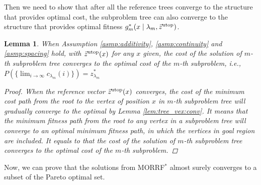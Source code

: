 \documentclass{article}
\newtheorem{lem}{Lemma}
\begin{document}
Then we need to show that after all the reference trees converge to the structure that provides optimal cost, 
the subproblem tree can also converge to the structure that provides optimal fitness $ g^{*}_{m} ( x \mid \lambda_{m} , \vec{z}^{\rm utop} ) $.
\begin{lem}
\label{lem:sub_tree:conv}
When Assumption \ref{asmp:additivity}, \ref{asmp:continuity} and \ref{asmp:spacing} hold,
with $ \vec{z}^{\rm utop} (x) $ for any $ x $ given,
the cost of the solution of $ m $-th subproblem tree converges to the optimal cost of the $ m $-th subproblem, i.e.,
$
P( \{ \lim_{ i \rightarrow \infty } c_{ \lambda_{m} }( i ) \} ) = z^{*}_{ \lambda_{m} }
$
\begin{proof}
When the reference vector $ \vec{z}^{\rm utop}(x) $ converges, the cost of the minimum cost path from the root to the vertex of position $ x $ in $ m $-th subproblem tree will gradually converge to the optimal by Lemma \ref{lem:tree_vex:conv}.
It means that the minimum fitness path from the root to any vertex in a subproblem tree will converge to an optimal minimum fitness path, in which the vertices in goal region are included.
It equals to that the cost of the solution of $ m $-th subproblem tree converges to the optimal cost of the $ m $-th subproblem.
\end{proof}
\end{lem}

Now, we can prove that the solutions from MORRF$^{*}$ almost surely converges to a subset of the Pareto optimal set.
\end{document}

